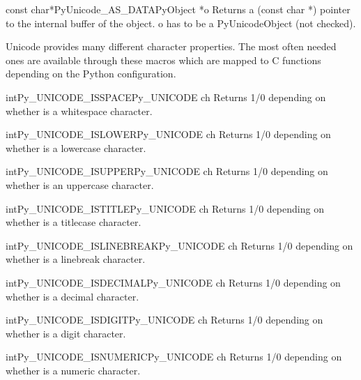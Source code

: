 \documentclass{manual}
\begin{document}
\begin{cfuncdesc}{const char*}{PyUnicode_AS_DATA}{PyObject *o}
Returns a (const char *) pointer to the internal buffer of the object.
o has to be a PyUnicodeObject (not checked).
\end{cfuncdesc}


Unicode provides many different character properties. The most often
needed ones are available through these macros which are mapped to C
functions depending on the Python configuration.

\begin{cfuncdesc}{int}{Py_UNICODE_ISSPACE}{Py_UNICODE ch}
Returns 1/0 depending on whether  is a whitespace character.
\end{cfuncdesc}

\begin{cfuncdesc}{int}{Py_UNICODE_ISLOWER}{Py_UNICODE ch}
Returns 1/0 depending on whether  is a lowercase character.
\end{cfuncdesc}

\begin{cfuncdesc}{int}{Py_UNICODE_ISUPPER}{Py_UNICODE ch}
Returns 1/0 depending on whether  is an uppercase character.
\end{cfuncdesc}

\begin{cfuncdesc}{int}{Py_UNICODE_ISTITLE}{Py_UNICODE ch}
Returns 1/0 depending on whether  is a titlecase character.
\end{cfuncdesc}

\begin{cfuncdesc}{int}{Py_UNICODE_ISLINEBREAK}{Py_UNICODE ch}
Returns 1/0 depending on whether  is a linebreak character.
\end{cfuncdesc}

\begin{cfuncdesc}{int}{Py_UNICODE_ISDECIMAL}{Py_UNICODE ch}
Returns 1/0 depending on whether  is a decimal character.
\end{cfuncdesc}

\begin{cfuncdesc}{int}{Py_UNICODE_ISDIGIT}{Py_UNICODE ch}
Returns 1/0 depending on whether  is a digit character.
\end{cfuncdesc}

\begin{cfuncdesc}{int}{Py_UNICODE_ISNUMERIC}{Py_UNICODE ch}
Returns 1/0 depending on whether  is a numeric character.
\end{cfuncdesc}
\end{document}
